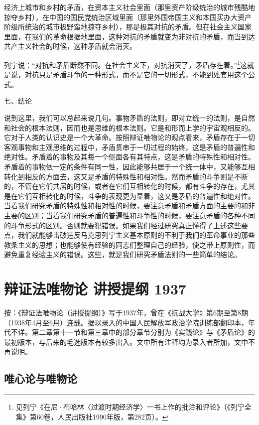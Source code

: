 \documentclass[UTF8, 12pt, a4paper]{ctexrep}
\begin{document}
经济上城市和乡村的矛盾，在资本主义社会里面（那里资产阶级统治的城市残酷地掠夺乡村），在中国的国民党统治区域里面（那里外国帝国主义和本国买办大资产阶级所统治的城市极野蛮地掠夺乡村），那是极其对抗的矛盾。但在社会主义国家里面，在我们的革命根据地里面，这种对抗的矛盾就变为非对抗的矛盾，而当到达共产主义社会的时候，这种矛盾就会消灭。

列宁说：“对抗和矛盾断然不同。在社会主义下，对抗消灭了，矛盾存在着。”\footnote{见列宁《在尼·布哈林〈过渡时期经济学〉一书上作的批注和评论》（《列宁全集》第60卷，人民出版社1990年版，第282页）。}这就是说，对抗只是矛盾斗争的一种形式，而不是它的一切形式，不能到处套用这个公式。

七、结论

说到这里，我们可以总起来说几句。事物矛盾的法则，即对立统一的法则，是自然和社会的根本法则，因而也是思维的根本法则。它是和形而上学的宇宙观相反的。它对于人类的认识史是一个大革命。按照辩证唯物论的观点看来，矛盾存在于一切客观事物和主观思维的过程中，矛盾贯串于一切过程的始终，这是矛盾的普遍性和绝对性。矛盾着的事物及其每一个侧面各有其特点，这是矛盾的特殊性和相对性。矛盾着的事物依一定的条件有同一性，因此能够共居于一个统一体中，又能够互相转化到相反的方面去，这又是矛盾的特殊性和相对性。然而矛盾的斗争则是不断的，不管在它们共居的时候，或者在它们互相转化的时候，都有斗争的存在，尤其是在它们互相转化的时候，斗争的表现更为显着，这又是矛盾的普遍性和绝对性。当着我们研究矛盾的特殊性和相对性的时候，要注意矛盾和矛盾方面的主要的和非主要的区别；当着我们研究矛盾的普遍性和斗争性的时候，要注意矛盾的各种不同的斗争形式的区别。否则就要犯错误。如果我们经过研究真正懂得了上述这些要点，我们就能够击破违反马克思列宁主义基本原则的不利于我们的革命事业的那些教条主义的思想；也能够使有经验的同志们整理自己的经验，使之带上原则性，而避免重复经验主义的错误。这些，就是我们研究矛盾法则的一些简单的结论。

\section{辩证法唯物论 讲授提纲 1937}

按：《辩证法唯物论（讲授提纲）》写于1937年，曾在《抗战大学》第6期至第8期（1938年4月至6月）连载。据以录入的中国人民解放军政治学院训练部翻印本，年代不详。第二章第十一节和第三章中的部分章节分别为《实践论》与《矛盾论》的最初版本，与后来的毛选版本有较多出入。文中所有注释均为录入者所加，文中不再说明。

\subsection{唯心论与唯物论}
\end{document}
